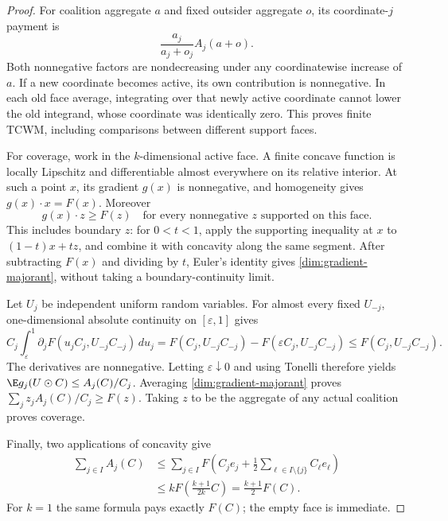 \begin{proof}
For coalition aggregate $a$ and fixed outsider aggregate $o$, its
coordinate-$j$ payment is
\[
 \frac{a_j}{a_j+o_j}A_j(a+o).
\]
Both nonnegative factors are nondecreasing under any coordinatewise
increase of $a$. If a new coordinate becomes active, its own contribution
is nonnegative. In each old face average, integrating over that newly
active coordinate cannot lower the old integrand, whose coordinate was
identically zero. This proves finite TCWM, including comparisons between
different support faces.

For coverage, work in the $k$-dimensional active face. A finite concave
function is locally Lipschitz and differentiable almost everywhere on its
relative interior. At such a point $x$, its gradient $g(x)$ is nonnegative,
and homogeneity gives $g(x)\cdot x=F(x)$. Moreover
\begin{equation}\label{dim:gradient-majorant}
 g(x)\cdot z\ge F(z)
 \quad\text{for every nonnegative $z$ supported on this face.}
\end{equation}
This includes boundary $z$: for $0<t<1$, apply the supporting inequality
at $x$ to $(1-t)x+tz$, and combine it with concavity along the same segment.
After subtracting $F(x)$ and dividing by $t$, Euler's identity gives
\eqref{dim:gradient-majorant}, without taking a boundary-continuity limit.

Let $U_j$ be independent uniform random variables. For almost every fixed
$U_{-j}$, one-dimensional absolute continuity on $[\varepsilon,1]$ gives
\[
 C_j\int_\varepsilon^1
 \partial_jF(u_jC_j,U_{-j}C_{-j})\,du_j
 =F(C_j,U_{-j}C_{-j})-F(\varepsilon C_j,U_{-j}C_{-j})
 \le F(C_j,U_{-j}C_{-j}).
\]
The derivatives are nonnegative. Letting $\varepsilon\downarrow0$ and
using Tonelli therefore yields
$\E g_j(U\mathbin{\odot}C)\le A_j(C)/C_j$.
Averaging \eqref{dim:gradient-majorant} proves
$\sum_jz_jA_j(C)/C_j\ge F(z)$. Taking $z$ to be the aggregate of any
actual coalition proves coverage.

Finally, two applications of concavity give
\begin{align*}
 \sum_{j\in I}A_j(C)
 &\le\sum_{j\in I}
 F\left(C_je_j+\tfrac12\sum_{\ell\in I\setminus\{j\}}C_\ell e_\ell\right)\\
 &\le kF\left(\frac{k+1}{2k}C\right)
 =\frac{k+1}{2}F(C).
\end{align*}
For $k=1$ the same formula pays exactly $F(C)$; the empty face is immediate.
\end{proof}

